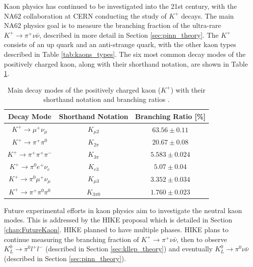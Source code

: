 \documentclass[../main.tex]{subfiles}
\begin{document}
    Kaon physics has continued to be investigated into the 21st century, with the NA62 collaboration at CERN conducting the study of $K^+$ decays. 
    The main NA62 physics goal is to measure the branching fraction of the ultra-rare $K^+ \to \pi^+ \nu \bar{\nu}$, described in more detail in Section \ref{sec:pinn_theory}.
    The $K^+$ consists of an up quark and an anti-strange quark, with the other kaon types described in Table \ref{tab:kaons_types}. 
    The six most common decay modes of the positively charged kaon, along with their shorthand notation, are shown in Table \ref{tab:kaon_decays}.

    \begin{table}[t]
        \centering
        \begin{tabular}{|c|c|c|}
            \hline
            \textbf{Decay Mode} & \textbf{Shorthand Notation} & \textbf{Branching Ratio [\%]} \\
            \hline
            $K^+ \to \mu^+ \nu_\mu$ & $K_{\mu2}$ & $63.56 \pm 0.11$ \\
            $K^+ \to \pi^+ \pi^0$ & $K_{2\pi}$ & $20.67 \pm 0.08$ \\
            $K^+ \to \pi^+ \pi^+ \pi^-$ & $K_{3\pi}$ & $5.583 \pm 0.024$ \\
            $K^+ \to \pi^0 e^+ \nu_e$ & $K_{e3}$ & $5.07 \pm 0.04$ \\
            $K^+ \to \pi^0 \mu^+ \nu_\mu$ & $K_{\mu3}$ & $3.352 \pm 0.034$ \\
            $K^+ \to \pi^+ \pi^0 \pi^0 $ & $K_{3\pi0}$ & $1.760 \pm 0.023$ \\
            \hline
        \end{tabular}
        \caption{Main decay modes of the positively charged kaon ($K^+$) with their shorthand notation and branching ratios \cite{Navas:2024}.}
        \label{tab:kaon_decays}
    \end{table}

    Future experimental efforts in kaon physics aim to investigate the neutral kaon modes. This is addressed by the \gls{HIKE} proposal which is detailed in Section \ref{chap:FutureKaon}. \gls{HIKE} planned to have multiple phases. \gls{HIKE} plans to continue measuring the branching fraction of $K^+ \to \pi^+ \nu \bar{\nu}$, then to observe $K^0_L \to \pi^0 l^+l^-$ (described in Section \ref{sec:kllep_theory}) and eventually $K^0_L \to \pi^0 \nu \bar{\nu}$ (described in Section \ref{sec:pinn_theory}).
\end{document}
